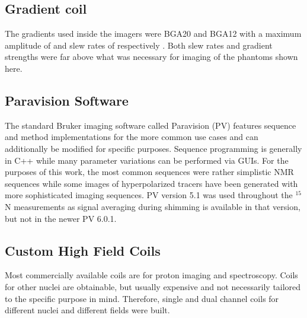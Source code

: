        \subsection{Gradient coil}
        The gradients used inside the imagers were BGA20 and BGA12 with a maximum amplitude of and slew rates of respectively . Both slew rates and gradient strengths were far above what was necessary for imaging of the phantoms shown here.
        \subsection{Paravision Software}
        The standard Bruker imaging software called Paravision (PV) features sequence and method implementations for the more common use cases and can additionally be modified for specific purposes. Sequence programming is generally in C++ while many parameter variations can be performed via GUIs.  For the purposes of this work, the most common sequences were rather simplistic NMR sequences while some images of hyperpolarized tracers have been generated with more sophisticated imaging sequences. PV version 5.1 was used throughout the $^{15}$N measurements as signal averaging during shimming is available in that version, but not in the newer PV 6.0.1.
        \subsection{Custom High Field Coils}
            Most commercially available coils are for proton imaging and spectroscopy. Coils for other nuclei are obtainable, but usually expensive and not necessarily tailored to the specific purpose in mind. Therefore, single and dual channel coils for different nuclei and different fields were built.
